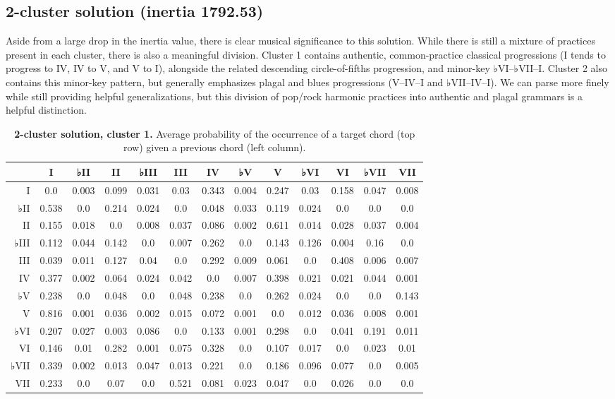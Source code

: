 \subsection{2-cluster solution (inertia 1792.53)}
\label{2-clustersolutioninertia1792.53}

Aside from a large drop in the inertia value, there is clear musical significance to this solution. While there is still a mixture of practices present in each cluster, there is also a meaningful division. Cluster 1 contains authentic, common-practice classical progressions (I tends to progress to IV, IV to V, and V to I), alongside the related descending circle-of-fifths progression, and minor-key ♭VI–♭VII–I. Cluster 2 also contains this minor-key pattern, but generally emphasizes plagal and blues progressions (V–IV–I and ♭VII–IV–I). We can parse more finely while still providing helpful generalizations, but this division of pop\slash rock harmonic practices into authentic and plagal grammars is a helpful distinction.

\begin{table}[htbp]
\begin{minipage}{\linewidth}
\setlength{\tymax}{0.5\linewidth}
\centering
\small
\caption{\textbf{2-cluster solution, cluster 1.} Average probability of the occurrence of a target chord (top row) given a previous chord (left column).}
\label{2-clustersolutioncluster1.averageprobabilityoftheoccurrenceofatargetchordtoprowgivenapreviouschordleftcolumn.}
\begin{tabulary}{\textwidth}{@{}RCCCCCCCCCCCC@{}} \toprule
&I&♭II&II&♭III&III&IV&♭V&V&♭VI&VI&♭VII&VII\\
\midrule
I&0.0&0.003&0.099&0.031&0.03&0.343&0.004&0.247&0.03&0.158&0.047&0.008\\
♭II&0.538&0.0&0.214&0.024&0.0&0.048&0.033&0.119&0.024&0.0&0.0&0.0\\
II&0.155&0.018&0.0&0.008&0.037&0.086&0.002&0.611&0.014&0.028&0.037&0.004\\
♭III&0.112&0.044&0.142&0.0&0.007&0.262&0.0&0.143&0.126&0.004&0.16&0.0\\
III&0.039&0.011&0.127&0.04&0.0&0.292&0.009&0.061&0.0&0.408&0.006&0.007\\
IV&0.377&0.002&0.064&0.024&0.042&0.0&0.007&0.398&0.021&0.021&0.044&0.001\\
♭V&0.238&0.0&0.048&0.0&0.048&0.238&0.0&0.262&0.024&0.0&0.0&0.143\\
V&0.816&0.001&0.036&0.002&0.015&0.072&0.001&0.0&0.012&0.036&0.008&0.001\\
♭VI&0.207&0.027&0.003&0.086&0.0&0.133&0.001&0.298&0.0&0.041&0.191&0.011\\
VI&0.146&0.01&0.282&0.001&0.075&0.328&0.0&0.107&0.017&0.0&0.023&0.01\\
♭VII&0.339&0.002&0.013&0.047&0.013&0.221&0.0&0.186&0.096&0.077&0.0&0.005\\
VII&0.233&0.0&0.07&0.0&0.521&0.081&0.023&0.047&0.0&0.026&0.0&0.0\\

\bottomrule

\end{tabulary}
\end{minipage}
\end{table}


